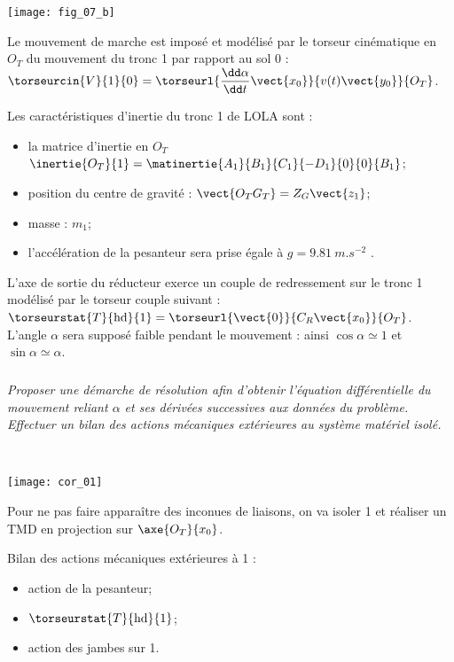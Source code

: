 \begin{multicols}{2}
\begin{center}
\texttt{[image: fig\_07\_b]}
\end{center}

Le mouvement de marche est imposé et modélisé par le torseur cinématique en $O_T$ du mouvement du tronc 1
par rapport au sol 0 : $\torseurcin{V}{1}{0}=\torseurl{\dfrac{\dd \alpha}{\dd t}\vect{x_0}}{v(t)\vect{y_0}}{O_T}$.

Les caractéristiques d'inertie du tronc 1 de LOLA sont :
\begin{itemize}
\item la matrice d'inertie en $O_T$ $\inertie{O_T}{1} = \matinertie{A_1}{B_1}{C_1}{-D_1}{0}{0}{B_1}$;
\item position du centre de gravité : $\vect{O_TG_T}=Z_G\vect{z_1}$;
\item masse : $m_1$;
\item l'accélération de la pesanteur sera prise égale à $g=\SI{9,81}{m.s^{-2}}$ .
\end{itemize}


L'axe de sortie du réducteur exerce un couple de redressement sur le tronc 1 modélisé par le torseur couple
suivant : $\torseurstat{T}{\text{hd}}{1}=\torseurl{\vect{0}}{C_R\vect{x_0}}{O_T}$. L'angle $\alpha$ sera supposé faible pendant le mouvement : ainsi $\cos \alpha \simeq 1$ et $\sin \alpha \simeq \alpha$.

\fi
\subparagraph{} \textit{Proposer une démarche de résolution afin d'obtenir l'équation différentielle du mouvement reliant $\alpha$ et
ses dérivées successives aux données du problème. Effectuer un bilan des actions mécaniques
extérieures au système matériel isolé.}
\ifprof
\begin{corrige} ~\\

\begin{center}
\texttt{[image: cor\_01]}
\end{center}

Pour ne pas faire apparaître des inconues de liaisons, on va isoler 1 et réaliser un TMD en projection sur $\axe{O_T}{x_0}$.

Bilan des actions mécaniques extérieures à 1 : 
\begin{itemize}
\item action de la pesanteur;
\item $\torseurstat{T}{\text{hd}}{1}$;
\item action des jambes sur 1. 
\end{itemize}
\end{corrige}
\else
\fi



\end{multicols}
